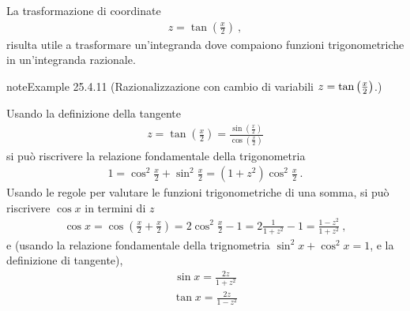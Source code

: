 \documentclass[letterpaper,10pt,italian]{jupyterBook}
\begin{document}
\sphinxAtStartPar
{} La trasformazione di coordinate
\begin{equation*}
\begin{split}z = \tan\left( \frac{x}{2} \right) \ ,\end{split}
\end{equation*}
\sphinxAtStartPar
risulta utile a trasformare un’integranda dove compaiono funzioni trigonometriche in un’integranda razionale.
\label{ch/infinitesimal_calculus/integrals:example-16}
\begin{sphinxadmonition}{note}{Example 25.4.11 (Razionalizzazione con cambio di variabili \protect\(z = \tan\left( \frac{x}{2} \right)\protect\).)}



\sphinxAtStartPar
Usando la definizione della tangente
\begin{equation*}
\begin{split}z = \tan \left(\frac{x}{2}\right) = \frac{\sin \left(\frac{x}{2}\right)}{\cos \left(\frac{x}{2}\right)}\end{split}
\end{equation*}
\sphinxAtStartPar
si può riscrivere la relazione fondamentale della trigonometria
\begin{equation*}
\begin{split}1 = \cos^2 \frac{x}{2} + \sin^2 \frac{x}{2} = (1 + z^2) \cos^2 \frac{x}{2}\ .\end{split}
\end{equation*}
\sphinxAtStartPar
Usando le regole per valutare le funzioni trigonometriche di una somma, si può riscrivere \(\cos x\) in termini di \(z\)
\begin{equation*}
\begin{split}\cos x = \cos \left( \frac{x}{2} + \frac{x}{2} \right) = 2 \cos^2 \frac{x}{2} - 1 = 2 \frac{1}{1+z^2} - 1 = \frac{1-z^2}{1+z^2} \ ,\end{split}
\end{equation*}
\sphinxAtStartPar
e (usando la relazione fondamentale della trignometria \(\sin^2 x + \cos^2 x = 1\), e la definizione di tangente),
\begin{equation*}
\begin{split}\sin x = \frac{2 z}{1 + z^2}\end{split}
\end{equation*}\begin{equation*}
\begin{split}\tan x = \frac{2 z}{1 - z^2}\end{split}
\end{equation*}\end{sphinxadmonition}
\end{document}

